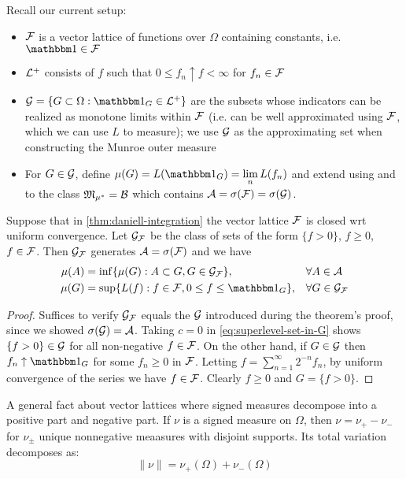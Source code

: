 
Recall our current setup:
\begin{itemize}
  \item $\mathcal{F}$ is a vector lattice of functions over $\Omega$
    containing constants, i.e.
    $\ind \in \cF$
  \item $\mathcal{L}^+$ consists of $f$ such that $0 \leq f_n \uparrow f < \infty$
    for $f_n \in \mathcal{F}$
  \item $\cG = \{G \subset \Omega : \ind_G \in \cL^+\}$ are the subsets
    whose indicators can be realized as monotone limits within $\mathcal{F}$
    (i.e. can be well approximated using $\mathcal{F}$, which we can use $L$ to
    measure); we use $\mathcal{G}$ as the approximating set when constructing
    the Munroe outer measure
  \item For $G \in \mathcal{G}$, define $\mu(G) = L(\ind_G) = \lim_n L(f_n)$
    and extend using  and
    to the class $\mathfrak{M}_{\mu^*} = \mathcal{B}$ which contains
    $\mathcal{A} = \sigma(\mathcal{F}) = \sigma(\mathcal{G})$.
\end{itemize}

\begin{corollary}
  Suppose that in \cref{thm:daniell-integration} the vector lattice $\mathcal{F}$ is
  closed wrt uniform convergence.
  Let $\mathcal{G}_{\mathcal{F}}$ be the class of sets of the form
  $\{f > 0\}$, $f \geq 0$, $f \in \mathcal{F}$.
  Then $\mathcal{G}_{\mathcal{F}}$ generates $\mathcal{A} = \sigma(\mathcal{F})$ and we have
  \begin{align*}
    \mu(A) &= \inf\{\mu(G) : A \subset G, G \in \cG_\cF\}, &&\forall A \in \cA \\
    \mu(G) &= \sup\{L(f) : f \in \cF, 0 \leq f \leq \ind_G\}, &&\forall G \in \cG_\cF
  \end{align*}
\end{corollary}


\begin{proof}
  Suffices to verify $\mathcal{G}_{\mathcal{F}}$ equals the $\mathcal{G}$ introduced during the
  theorem's proof, since we showed $\sigma(\mathcal{G}) = \mathcal{A}$.
  Taking $c=0$ in \cref{eq:superlevel-set-in-G} shows
  $\{f > 0\} \in \mathcal{G}$ for all non-negative $f \in \mathcal{F}$.
  On the other hand, if $G \in \mathcal{G}$ then $f_n \uparrow \ind_G$
  for some $f_n \geq 0$ in $\mathcal{F}$. Letting $f = \sum_{n=1}^\infty 2^{-n} f_n$,
  by uniform convergence of the series we have $f \in \mathcal{F}$.
  Clearly $f \geq 0$ and $G = \{f > 0\}$.
\end{proof}

A general fact about vector lattices where signed measures decompose into
a positive part and negative part. If $\nu$ is a signed measure on $\Omega$,
then $\nu = \nu_+ - \nu_-$ for $\nu_{\pm}$ unique nonnegative meaasures with
disjoint supports. Its total variation decomposes as:
\[
  \|\nu\| = \nu_+(\Omega) + \nu_-(\Omega)
\]


